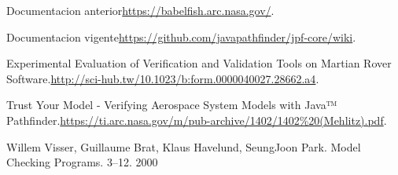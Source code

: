 \documentclass[runningheads]{llncs}
\begin{document}
%
%
%
% 
% 
%
\begin{thebibliography}{8}
Documentacion anterior\url{https://babelfish.arc.nasa.gov/}.

Documentacion vigente\url{https://github.com/javapathfinder/jpf-core/wiki}.

Experimental Evaluation of Verification and Validation Tools on Martian Rover Software.\url{http://sci-hub.tw/10.1023/b:form.0000040027.28662.a4}.

Trust Your Model - Verifying Aerospace System Models with Java™ Pathfinder.\url{https://ti.arc.nasa.gov/m/pub-archive/1402/1402\%20(Mehlitz).pdf}.

Willem Visser, Guillaume Brat, Klaus Havelund, SeungJoon Park. Model Checking
Programs. 3–12. 2000

\end{thebibliography}
\end{document}
